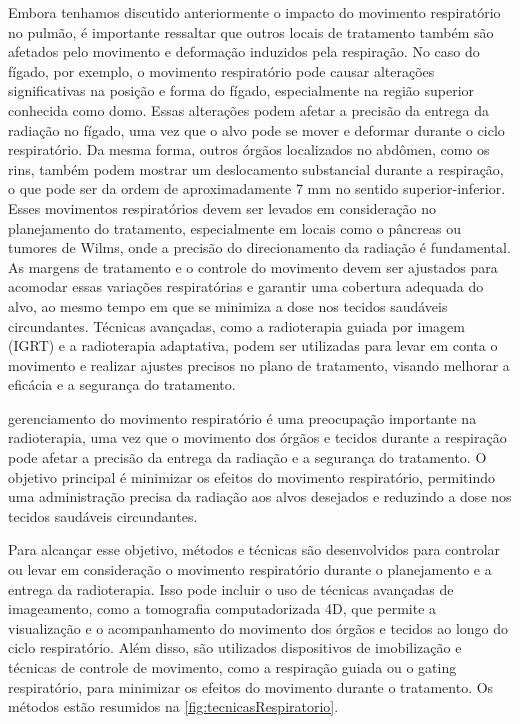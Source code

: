 \documentclass[11pt,a4paper]{article}
\newcounter{exemplo}
\begin{document}
	Embora tenhamos discutido anteriormente o impacto do movimento respiratório no pulmão, é importante ressaltar que outros locais de tratamento também são afetados pelo movimento e deformação induzidos pela respiração. No caso do fígado, por exemplo, o movimento respiratório pode causar alterações significativas na posição e forma do fígado, especialmente na região superior conhecida como domo. Essas alterações podem afetar a precisão da entrega da radiação no fígado, uma vez que o alvo pode se mover e deformar durante o ciclo respiratório. Da mesma forma, outros órgãos localizados no abdômen, como os rins, também podem mostrar um deslocamento substancial durante a respiração, o que pode ser da ordem de aproximadamente 7 mm no sentido superior-inferior. Esses movimentos respiratórios devem ser levados em consideração no planejamento do tratamento, especialmente em locais como o pâncreas ou tumores de Wilms, onde a precisão do direcionamento da radiação é fundamental. As margens de tratamento e o controle do movimento devem ser ajustados para acomodar essas variações respiratórias e garantir uma cobertura adequada do alvo, ao mesmo tempo em que se minimiza a dose nos tecidos saudáveis circundantes. Técnicas avançadas, como a radioterapia guiada por imagem (IGRT) e a radioterapia adaptativa, podem ser utilizadas para levar em conta o movimento e realizar ajustes precisos no plano de tratamento, visando melhorar a eficácia e a segurança do tratamento.

	gerenciamento do movimento respiratório é uma preocupação importante na radioterapia, uma vez que o movimento dos órgãos e tecidos durante a respiração pode afetar a precisão da entrega da radiação e a segurança do tratamento. O objetivo principal é minimizar os efeitos do movimento respiratório, permitindo uma administração precisa da radiação aos alvos desejados e reduzindo a dose nos tecidos saudáveis circundantes.

	Para alcançar esse objetivo, métodos e técnicas são desenvolvidos para controlar ou levar em consideração o movimento respiratório durante o planejamento e a entrega da radioterapia. Isso pode incluir o uso de técnicas avançadas de imageamento, como a tomografia computadorizada 4D, que permite a visualização e o acompanhamento do movimento dos órgãos e tecidos ao longo do ciclo respiratório. Além disso, são utilizados dispositivos de imobilização e técnicas de controle de movimento, como a respiração guiada ou o gating respiratório, para minimizar os efeitos do movimento durante o tratamento. Os métodos estão resumidos na \ref{fig:tecnicasRespiratorio}.
\end{document}
